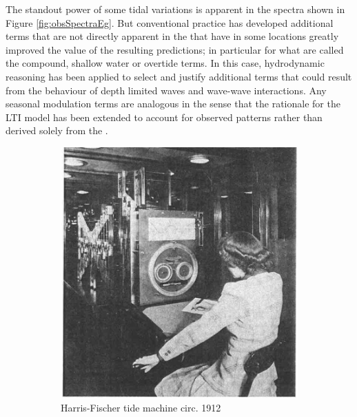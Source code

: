 The standout power of some tidal variations is apparent in the spectra shown in Figure \ref{fig:obsSpectraEg}. 
But conventional practice has developed additional terms that are not directly apparent in the \ATGP{} that have in some locations greatly improved the value of the resulting predictions; in particular for what are called the compound, shallow water or overtide terms. In this case, hydrodynamic reasoning has been applied to select and justify additional terms that could result from the behaviour of depth limited waves and wave-wave interactions.
Any seasonal modulation terms are analogous in the sense that the rationale for the LTI model has been extended to account for observed patterns rather than derived solely from the \ATGP{}.
\begin{figure}[!hbt] \centering
	\begin{subfigure}[t]{\figwidthHalf}
	    \includegraphics[width=\textwidth]{figures/images/zetler_tidal_computer_lady_1921.png}
	    \caption{Harris-Fischer tide machine circ. 1912 }
    \end{subfigure}
    \hfill
    \begin{subfigure}[t]{\figwidthHalf}

\end{subfigure}
\end{figure}
